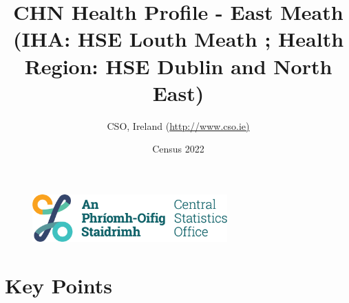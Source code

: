 \documentclass{article}
\title{CHN Health Profile - East Meath (IHA: HSE Louth Meath ;  Health Region: HSE Dublin and North East) }
\date{Census 2022}
\author{CSO, Ireland  (\url{http://www.cso.ie)}}
\begin{document}


\begin{figure}
	\centering
\includegraphics[width =75mm]{../figures/CSO_Logo.png}
\end{figure}

				 
		   
						  
														  
																																													
												 
			 
\maketitle
					
													   
				 
						 
																																																																											   
				 
				  
  \pagebreak
    	    \tableofcontents

\pagebreak


\section{Key Points}
\end{document}
